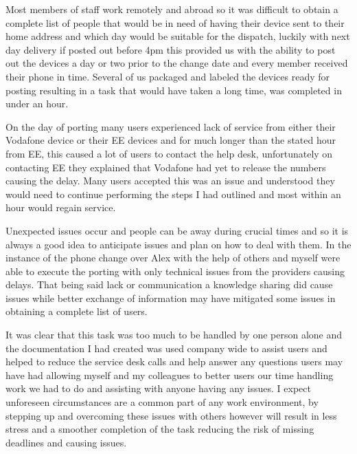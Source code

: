 Most members of staff work remotely and abroad so it was difficult to
obtain a complete list of people that would be in need of having their
device sent to their home address and which day would be suitable for
the dispatch, luckily with next day delivery if posted out before 4pm
this provided us with the ability to post out the devices a day or two
prior to the change date and every member received their phone in time.
Several of us packaged and labeled the devices ready for posting
resulting in a task that would have taken a long time, was completed in
under an hour.

On the day of porting many users experienced lack of service from either
their Vodafone device or their EE devices and for much longer than the
stated hour from EE, this caused a lot of users to contact the help
desk, unfortunately on contacting EE they explained that Vodafone had
yet to release the numbers causing the delay. Many users accepted this
was an issue and understood they would need to continue performing the
steps I had outlined and most within an hour would regain service.

Unexpected issues occur and people can be away during crucial times and
so it is always a good idea to anticipate issues and plan on how to deal
with them. In the instance of the phone change over Alex with the help
of others and myself were able to execute the porting with only
technical issues from the providers causing delays. That being said lack
or communication a knowledge sharing did cause issues while better
exchange of information may have mitigated some issues in obtaining a
complete list of users.

It was clear that this task was too much to be handled by one person
alone and the documentation I had created was used company wide to
assist users and helped to reduce the service desk calls and help answer
any questions users may have had allowing myself and my colleagues to
better users our time handling work we had to do and assisting with
anyone having any issues. I expect unforeseen circumstances are a common
part of any work environment, by stepping up and overcoming these issues
with others however will result in less stress and a smoother completion
of the task reducing the risk of missing deadlines and causing issues.
